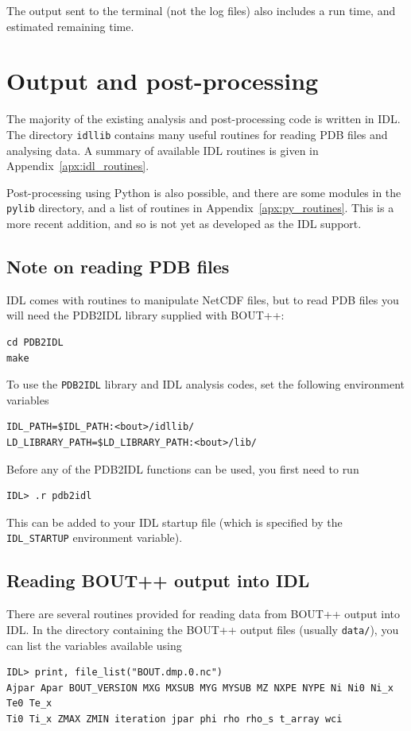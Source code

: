 \documentclass[12pt]{article}
\newcommand{\code}[1]{\texttt{#1}}
\begin{document}
The output sent to the terminal (not the log files) also includes a run time, and estimated
remaining time.

\section{Output and post-processing}
\label{sec:output}

The majority of the existing analysis and post-processing code is written
in IDL. The directory \texttt{idllib} contains many useful routines for
reading PDB files and analysing data. A summary of available IDL routines
is given in Appendix~\ref{apx:idl_routines}.

Post-processing using Python is also possible, and there are some modules
in the \texttt{pylib} directory, and a list of routines in Appendix~\ref{apx:py_routines}. This is a more recent addition, and so is
not yet as developed as the IDL support. 


\subsection{Note on reading PDB files}

IDL comes with routines to manipulate NetCDF files, but to read PDB files you will need the PDB2IDL library
supplied with BOUT++:
\begin{verbatim}
cd PDB2IDL
make
\end{verbatim}
To use the \code{PDB2IDL} library and IDL analysis codes, set the following environment variables
\begin{verbatim}
IDL_PATH=$IDL_PATH:<bout>/idllib/
LD_LIBRARY_PATH=$LD_LIBRARY_PATH:<bout>/lib/
\end{verbatim}
Before any of the PDB2IDL functions can be used, you first need to run
\begin{verbatim}
IDL> .r pdb2idl
\end{verbatim}
This can be added to your IDL startup file (which is specified by the
\code{IDL\_STARTUP} environment variable).

\subsection{Reading BOUT++ output into IDL}
There are several routines provided for reading data from BOUT++ output into
IDL. In the directory containing the BOUT++ output files
(usually \texttt{data/}), you can list the variables available using
\begin{verbatim}
IDL> print, file_list("BOUT.dmp.0.nc")
Ajpar Apar BOUT_VERSION MXG MXSUB MYG MYSUB MZ NXPE NYPE Ni Ni0 Ni_x Te0 Te_x
Ti0 Ti_x ZMAX ZMIN iteration jpar phi rho rho_s t_array wci
\end{verbatim}
\end{document}

